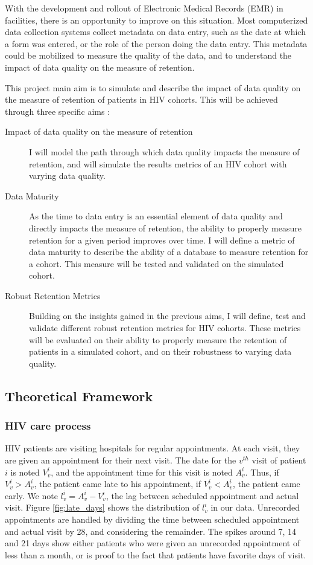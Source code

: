 With the development and rollout of Electronic Medical Records (EMR) in facilities, there is an opportunity to improve on this situation. Most computerized data collection systems collect metadata on data entry, such as the date at which a form was entered, or the role of the person doing the data entry. This metadata could be mobilized to measure the quality of the data, and to understand the impact of data quality on the measure of retention.

This project main aim is to simulate and describe the impact of data quality on the measure of retention of patients in HIV cohorts. This will be achieved through three specific aims :

\begin{description}
	\item[Impact of data quality on the measure of retention] I will model the path through which data quality impacts the measure of retention, and will simulate the results metrics of an HIV cohort with varying data quality.
	\item[Data Maturity] As the time to data entry is an essential element of data quality and directly impacts the measure of retention, the ability to properly measure retention for a given period improves over time. I will define a metric of data maturity to describe the ability of a database to measure retention for a cohort. This measure will be tested and validated on the simulated cohort.
	\item[Robust Retention Metrics] Building on the insights gained in the previous aims, I will define, test and validate different robust retention metrics for HIV cohorts. These metrics will be evaluated on their ability to properly measure the retention of patients in a simulated cohort, and on their robustness to varying data quality.
\end{description}


\subsection{Theoretical Framework}

\subsubsection{HIV care process}

HIV patients are visiting hospitals for regular appointments. At each visit, they are given an appointment for their next visit. The date for the $v^{th}$ visit of patient $i$ is noted $V_v^i$, and the appointment time for this visit is noted $A_v^i$. Thus, if $V_v^i > A_v^i$, the patient came late to his appointment, if $V_v^i < A_v^i$, the patient came early. We note $l_v^i = A_v^i - V_v^i$, the lag between scheduled appointment and actual visit. Figure \ref{fig:late_days} shows the distribution of $l_v^i$ in our data. Unrecorded appointments are handled by dividing the time between scheduled appointment and actual visit by 28, and considering the remainder. The spikes around 7, 14 and 21 days show either patients who were given an unrecorded appointment of less than a month, or is proof to the fact that patients have favorite days of visit.

